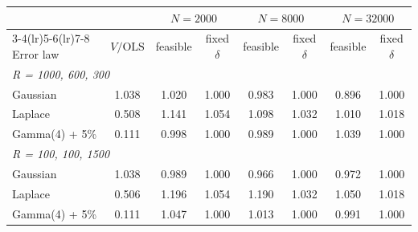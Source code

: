 \begin{tabular}{lccccccc}
\toprule
 & & \multicolumn{2}{c}{$N=2000$} & \multicolumn{2}{c}{$N=8000$} & \multicolumn{2}{c}{$N=32000$} \\
\cmidrule(lr){3-4}\cmidrule(lr){5-6}\cmidrule(lr){7-8}
Error law & $V/\mathrm{OLS}$ & feasible & fixed $\delta$ & feasible & fixed $\delta$ & feasible & fixed $\delta$ \\
\midrule
\multicolumn{8}{l}{\emph{R = 1000, 600, 300}} \\
Gaussian & 1.038 & 1.020 & 1.000 & 0.983 & 1.000 & 0.896 & 1.000 \\
Laplace & 0.508 & 1.141 & 1.054 & 1.098 & 1.032 & 1.010 & 1.018 \\
Gamma(4) + 5\% & 0.111 & 0.998 & 1.000 & 0.989 & 1.000 & 1.039 & 1.000 \\
\multicolumn{8}{l}{\emph{R = 100, 100, 1500}} \\
Gaussian & 1.038 & 0.989 & 1.000 & 0.966 & 1.000 & 0.972 & 1.000 \\
Laplace & 0.506 & 1.196 & 1.054 & 1.190 & 1.032 & 1.050 & 1.018 \\
Gamma(4) + 5\% & 0.111 & 1.047 & 1.000 & 1.013 & 1.000 & 0.991 & 1.000 \\
\bottomrule
\end{tabular}
